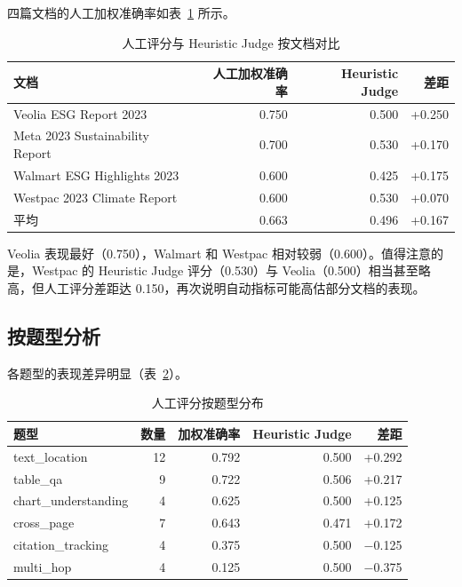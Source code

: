 四篇文档的人工加权准确率如表~\ref{tab:human-eval-doc} 所示。

\begin{table}[htbp]
\centering
\caption{人工评分与 Heuristic Judge 按文档对比}
\label{tab:human-eval-doc}
\begin{tabular}{@{}lrrr@{}}
\toprule
\textbf{文档} & \textbf{人工加权准确率} & \textbf{Heuristic Judge} & \textbf{差距} \\
\midrule
Veolia ESG Report 2023 & 0.750 & 0.500 & +0.250 \\
Meta 2023 Sustainability Report & 0.700 & 0.530 & +0.170 \\
Walmart ESG Highlights 2023 & 0.600 & 0.425 & +0.175 \\
Westpac 2023 Climate Report & 0.600 & 0.530 & +0.070 \\
\midrule
平均 & 0.663 & 0.496 & +0.167 \\
\bottomrule
\end{tabular}
\end{table}

Veolia 表现最好（0.750），Walmart 和 Westpac 相对较弱（0.600）。值得注意的是，Westpac 的 Heuristic Judge 评分（0.530）与 Veolia（0.500）相当甚至略高，但人工评分差距达 0.150，再次说明自动指标可能高估部分文档的表现。

\subsection{按题型分析}

各题型的表现差异明显（表~\ref{tab:human-eval-type}）。

\begin{table}[htbp]
\centering
\caption{人工评分按题型分布}
\label{tab:human-eval-type}
\begin{tabular}{@{}lrrrr@{}}
\toprule
\textbf{题型} & \textbf{数量} & \textbf{加权准确率} & \textbf{Heuristic Judge} & \textbf{差距} \\
\midrule
text\_location & 12 & 0.792 & 0.500 & +0.292 \\
table\_qa & 9 & 0.722 & 0.506 & +0.217 \\
chart\_understanding & 4 & 0.625 & 0.500 & +0.125 \\
cross\_page & 7 & 0.643 & 0.471 & +0.172 \\
citation\_tracking & 4 & 0.375 & 0.500 & $-$0.125 \\
multi\_hop & 4 & 0.125 & 0.500 & $-$0.375 \\
\bottomrule
\end{tabular}
\end{table}

